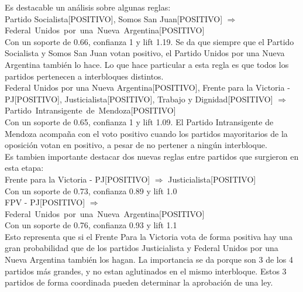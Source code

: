 \documentclass{endm}
\begin{document}
Es destacable un análisis sobre algunas reglas: \\

{Partido Socialista[POSITIVO], Somos San Juan[POSITIVO]} $\Longrightarrow$ \\ {Federal\ Unidos\ por\ una\ Nueva\ Argentina[POSITIVO]} \\

Con un soporte de 0.66, confianza 1 y lift 1.19. Se da que siempre que el Partido Socialista y Somos San Juan votan positivo, el Partido Unidos por una Nueva Argentina también lo hace. Lo que hace particular a esta regla es que todos los partidos pertenecen a interbloques distintos. \\


{Federal Unidos por una Nueva Argentina[POSITIVO], Frente para la Victoria - PJ[POSITIVO], Justicialista[POSITIVO], Trabajo y Dignidad[POSITIVO]}   $\Longrightarrow$ {Partido\ Intransigente\ de\ Mendoza[POSITIVO]} \\

Con un soporte de 0.65, confianza 1 y lift 1.09. El Partido Intransigente de Mendoza acompaña con el voto positivo cuando los partidos mayoritarios de la oposición votan en positivo, a pesar de no pertener a ningún interbloque. \\



Es tambien importante destacar dos nuevas reglas entre partidos que surgieron en esta etapa: \\

{Frente para la Victoria - PJ[POSITIVO]}  $\Longrightarrow$ {Justicialista[POSITIVO]} \\

Con un soporte de 0.73, confianza 0.89 y lift 1.0 \\

{FPV - PJ[POSITIVO]}  $\Longrightarrow$ {Federal\ Unidos\ por\ una\ Nueva\ Argentina[POSITIVO]} \\

Con un soporte de 0.76, confianza 0.93 y lift 1.1 \\

Esto representa que si el Frente Para la Victoria vota de forma positiva hay una gran probabilidad que de los partidos Justicialista y Federal Unidos por una Nueva Argentina también los hagan. La importancia se da porque son 3 de los 4 partidos más grandes, y no estan aglutinados en el mismo interbloque. Estos 3 partidos de forma coordinada pueden determinar la aprobación de una ley.
\end{document}

